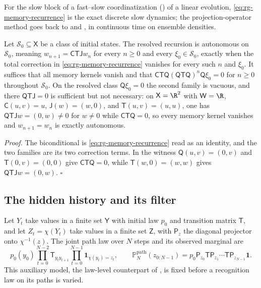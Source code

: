 For the slow block of a fast--slow coordinatization
() of a linear evolution,
\eqref{eq:rg-memory-recurrence} is the exact discrete slow dynamics; the
projection-operator method goes back to \citet{Nakajima1958} and
\citet{Zwanzig1960}, in continuous time on ensemble densities.

Let $\mathscr S_0\subseteq\mathsf X$ be a class of initial states. The resolved
recursion is autonomous on $\mathscr S_0$, meaning $w_{n+1}=\mathsf C\mathsf T\mathsf
Jw_n$ for every $n\ge0$ and every $\xi_0\in\mathscr S_0$, exactly when the total
correction in \eqref{eq:rg-memory-recurrence} vanishes for every such $n$ and
$\xi_0$. It suffices that all memory kernels vanish and that
$\mathsf C\mathsf T\mathsf Q(\mathsf Q\mathsf T\mathsf Q)^n\mathsf Q\xi_0=0$ for
$n\ge0$ throughout $\mathscr S_0$. On the resolved class $\mathsf Q\xi_0=0$ the
second family is vacuous, and there $\mathsf Q\mathsf T\mathsf J=0$ is sufficient but
not necessary: on $\mathsf X=\R^2$ with $\mathsf W=\R$, $\mathsf C(u,v)=u$,
$\mathsf J(w)=(w,0)$, and $\mathsf T(u,v)=(u,u)$, one has
$\mathsf Q\mathsf T\mathsf Jw=(0,w)\ne0$ for $w\ne0$ while $\mathsf C\mathsf T\mathsf
Q=0$, so every memory kernel vanishes and $w_{n+1}=w_n$ is exactly autonomous.

\noindent\emph{Proof.}
The biconditional is \eqref{eq:rg-memory-recurrence} read as an identity, and the two
families are its two correction terms. In the witness
$\mathsf Q(u,v)=(0,v)$ and $\mathsf T(0,v)=(0,0)$ give $\mathsf C\mathsf T\mathsf Q=0$,
while $\mathsf T(w,0)=(w,w)$ gives $\mathsf Q\mathsf T\mathsf Jw=(0,w)$. $\square$

\subsection{The hidden history and its filter}
\label{sec:rg-memory-hidden-history}

Let $Y_t$ take values in a finite set $\mathsf Y$ with initial law $p_0$ and
transition matrix $\mathsf T$, and let $Z_t=\chi(Y_t)$ take values in a finite set
$\mathsf Z$, with $\mathsf P_z$ the diagonal projector onto $\chi^{-1}(z)$. The
joint path law over $N$ steps and its observed marginal are
\begin{equation}
p_0(y_0)\prod_{t=0}^{N-2}\mathsf T_{y_ty_{t+1}}\prod_{t=0}^{N-1}\mathbf 1_{\chi(y_t)=z_t},
\qquad
\mathbb P^{\mathrm{path}}_N(z_{0:N-1})
=p_0\mathsf P_{z_0}\mathsf T\mathsf P_{z_1}\cdots\mathsf T\mathsf P_{z_{N-1}}\mathbf 1 .
\label{eq:rg-memory-hidden-path}
\end{equation}
This auxiliary model, the law-level counterpart of ,
is fixed before a recognition law on its paths is varied.

